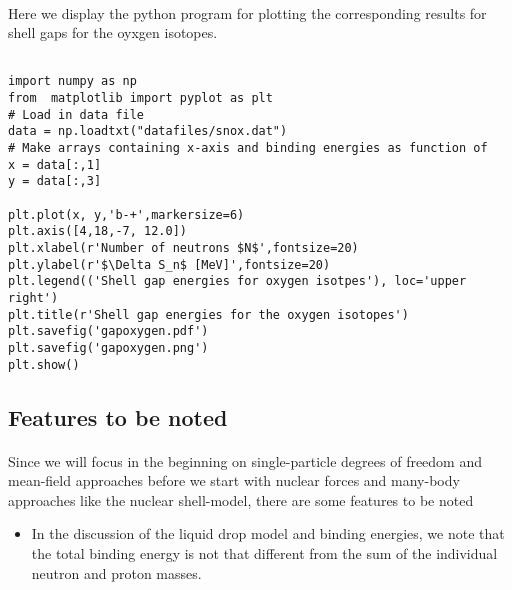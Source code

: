 \documentclass[%
twoside,                 %
final,                   %
10pt]{article}
\begin{document}
\paragraph{}
Here we display the python program for plotting the corresponding results for shell gaps for the oyxgen isotopes. 
\begin{verbatim}

import numpy as np
from  matplotlib import pyplot as plt
# Load in data file
data = np.loadtxt("datafiles/snox.dat")
# Make arrays containing x-axis and binding energies as function of
x = data[:,1]
y = data[:,3]

plt.plot(x, y,'b-+',markersize=6)
plt.axis([4,18,-7, 12.0])
plt.xlabel(r'Number of neutrons $N$',fontsize=20)
plt.ylabel(r'$\Delta S_n$ [MeV]',fontsize=20)
plt.legend(('Shell gap energies for oxygen isotpes'), loc='upper right')
plt.title(r'Shell gap energies for the oxygen isotopes')
plt.savefig('gapoxygen.pdf')
plt.savefig('gapoxygen.png')
plt.show()
\end{verbatim}






\subsection*{Features to be noted}

\paragraph{}
Since we will focus in the beginning on single-particle degrees of freedom and mean-field approaches before we
start with nuclear forces and many-body approaches like the nuclear shell-model, there are some features to be noted

\begin{itemize}
\item In the discussion of the liquid drop model and binding energies, we note that the total binding energy is not that different from the sum of the individual neutron and proton masses. 
\end{itemize}
\end{document}
